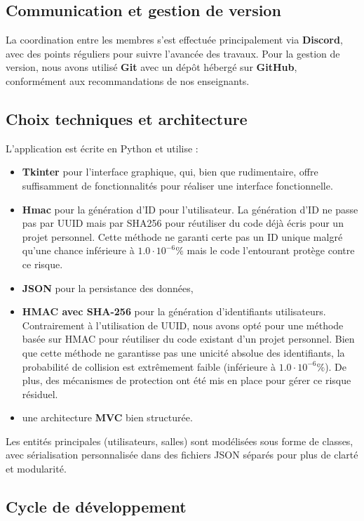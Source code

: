\documentclass[a4paper,12pt]{article}
\begin{document}
\subsection{Communication et gestion de version}

La coordination entre les membres s’est effectuée principalement via \textbf{Discord}, avec des points réguliers pour suivre l’avancée des travaux. Pour la gestion de version, nous avons utilisé \textbf{Git} avec un dépôt hébergé sur \textbf{GitHub}, conformément aux recommandations de nos enseignants.

\subsection{Choix techniques et architecture}

L'application est écrite en Python et utilise :
\begin{itemize}
    \item \textbf{Tkinter} pour l’interface graphique, qui, bien que rudimentaire, offre suffisamment de fonctionnalités
          pour réaliser une interface fonctionnelle.\item \textbf{Hmac} pour la génération d'ID pour l'utilisateur. La génération d'ID ne passe pas par UUID mais par SHA256 pour réutiliser du code déjà écris pour un projet personnel. Cette méthode ne garanti certe pas un ID unique malgré qu'une chance inférieure à $1.0\cdot 10^{-6}\%$ mais le code l'entourant protège contre ce risque.
    \item \textbf{JSON} pour la persistance des données,
    \item \textbf{HMAC avec SHA-256} pour la génération d'identifiants utilisateurs. Contrairement à l'utilisation de UUID, nous avons opté pour une méthode basée sur HMAC pour réutiliser du code existant d'un projet personnel. Bien que cette méthode ne garantisse pas une unicité absolue des identifiants, la probabilité de collision est extrêmement faible (inférieure à $1.0 \cdot 10^{-6}\%$). De plus, des mécanismes de protection ont été mis en place pour gérer ce risque résiduel.
    \item une architecture \textbf{MVC} bien structurée.
\end{itemize}

Les entités principales (utilisateurs, salles) sont modélisées sous forme de classes, avec sérialisation personnalisée dans des fichiers JSON séparés pour plus de clarté et modularité.

\subsection{Cycle de développement}
\end{document}
